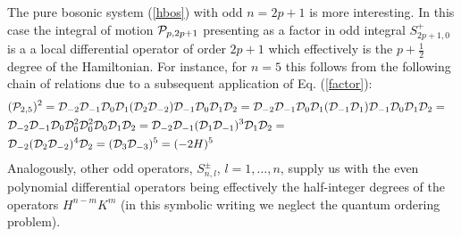 \documentclass[a4paper,12pt]{article}
\begin{document}
The pure bosonic system
(\ref{hbos}) with odd $n=2p+1$  is more interesting.
In this case the integral of motion ${\cal P}_{p,2p+1}$
presenting as a factor in odd integral
$S^+_{2p+1,0}$ is a a local differential operator
of order $2p+1$ which  effectively
is the
$p+\frac{1}{2}$ degree of the Hamiltonian.
For instance, for $n=5$ this follows from the following
chain of relations due to a subsequent application
of Eq. (\ref{factor}):
\begin{eqnarray}
&({\cal P}_{2,5})^2={\cal D}_{-2}{\cal D}_{-1}{\cal D}_{0}
{\cal D}_{1}({\cal D}_{2}{\cal D}_{-2}){\cal D}_{-1}
{\cal D}_{0}{\cal D}_{1}{\cal D}_{2}=
{\cal D}_{-2}{\cal D}_{-1}{\cal D}_{0}
{\cal D}_{1}({\cal D}_{-1}{\cal D}_{1}){\cal D}_{-1}
{\cal D}_{0}{\cal D}_{1}{\cal D}_{2}=&\nonumber\\
&{\cal D}_{-2}{\cal D}_{-1}{\cal D}_{0}
{\cal D}_{0}^2{\cal D}_{0}^2
{\cal D}_{0}{\cal D}_{1}{\cal D}_{2}=
{\cal D}_{-2}{\cal D}_{-1}({\cal D}_{1}
{\cal D}_{-1})^3{\cal D}_{1}{\cal D}_{2}=&\nonumber\\
&{\cal D}_{-2}({\cal D}_{2}{\cal D}_{-2})^4
{\cal D}_{2}=({\cal D}_{3}{\cal D}_{-3})^5=
(-2H)^5&
\end{eqnarray}
Analogously, other odd operators,
$S^\pm_{n,l}$, $l=1,\ldots,n$, supply us with
the even polynomial differential operators being
effectively the half-integer degrees of the  operators
$H^{n-m}K^{m}$ (in this symbolic writing we neglect the
quantum ordering problem).
\end{document}

